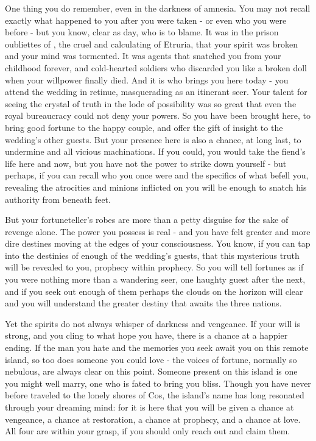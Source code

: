 \documentclass[char]{Kos}
\begin{document}
One thing you do remember, even in the darkness of amnesia. You may not recall exactly what happened to you after you were taken - or even who you were before - but you know, clear as day, who is to blame. It was in the prison oubliettes of \cEtruriaKing{}, the cruel and calculating \cEtruriaKing{\monarch} of Etruria, that your spirit was broken and your mind was tormented. It was \cEtruriaKing{\their} agents that snatched you from your childhood forever, and \cEtruriaKing{\their} cold-hearted soldiers who discarded you like a broken doll when your willpower finally died. And it is \cEtruriaKing{} who brings you here today - you attend the wedding in \cEtruriaKing{\their} retinue, masquerading as an itinerant seer. Your talent for seeing the crystal of truth in the lode of possibility was so great that even the royal bureaucracy could not deny your powers. So you have been brought here, to bring good fortune to the happy couple, and offer the gift of insight to the wedding's other guests. But your presence here is also a chance, at long last, to undermine \cEtruriaKing{\Monarch} \cEtruriaKing{} and all \cEtruriaKing{\their} vicious machinations. If you could, you would take the fiend's life here and now, but you have not the power to strike \cEtruriaKing{\them} down yourself - but perhaps, if you can recall who you once were and the specifics of what befell you, revealing the atrocities \cEtruriaKing{} and \cEtruriaKing{\their} minions inflicted on you will be enough to snatch his authority from beneath \cEtruriaKing{\their} feet.

But your fortuneteller's robes are more than a petty disguise for the sake of revenge alone. The power you possess is real - and you have felt greater and more dire destines moving at the edges of your consciousness. You know, if you can tap into the destinies of enough of the wedding's guests, that this mysterious truth will be revealed to you, prophecy within prophecy. So you will tell fortunes as if you were nothing more than a wandering seer, one haughty guest after the next, and if you seek out enough of them perhaps the clouds on the horizon will clear and you will understand the greater destiny that awaits the three nations.

Yet the spirits do not always whisper of darkness and vengeance. If your will is strong, and you cling to what hope you have, there is a chance at a happier ending. If the man you hate and the memories you seek await you on this remote island, so too does someone you could love - the voices of fortune, normally so nebulous, are always clear on this point. Someone present on this island is one you might well marry, one who is fated to bring you bliss. Though you have never before traveled to the lonely shores of Cos, the island's name has long resonated through your dreaming mind: for it is here that you will be given a chance at vengeance, a chance at restoration, a chance at prophecy, and a chance at love. All four are within your grasp, if you should only reach out and claim them. 
\end{document}
